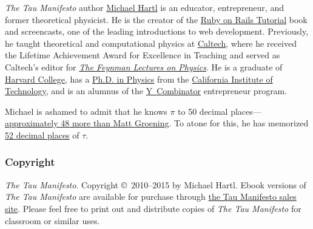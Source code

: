 
\emph{The Tau Manifesto} author \href{http://www.michaelhartl.com/}{Michael Hartl} is an educator, entrepreneur, and former theoretical physicist. He is the creator of the \href{http://www.railstutorial.org/}{Ruby on Rails Tutorial} book and screencasts, one of the leading introductions to web development. Previously, he taught theoretical and computational physics at  \href{http://www.caltech.edu/}{Caltech}, where he received the Lifetime Achievement Award for Excellence in Teaching and served as Caltech's editor for \href{http://www.feynmanlectures.caltech.edu/}{\emph{The Feynman Lectures on Physics}}. He is a graduate of \href{http://college.harvard.edu/}{Harvard College}, has a \href{http://thesis.library.caltech.edu/1940/}{Ph.D. in Physics} from the \href{http://www.caltech.edu/}{California Institute of Technology}, and is an alumnus of the \href{http://ycombinator.com/}{Y~Combinator} entrepreneur program.

Michael is ashamed to admit that he knows $\pi$ to 50 decimal places---\href{\#fig:futurama_video}{approximately 48 more than Matt Groening}. To atone for this, he has memorized \href{http://www.wolframalpha.com/input/?i=N[2+Pi,+53]}{52 decimal places} of $\tau$.

    \subsubsection{Copyright} %
    \label{sec:copyright_and_license}

    \emph{The Tau Manifesto}. Copyright \copyright\ 2010--2015 by Michael Hartl. Ebook versions of \emph{The Tau Manifesto} are available for purchase through \href{http://sales.tauday.com/}{the Tau Manifesto sales site}. Please feel free to print out and distribute copies of \emph{The Tau Manifesto} for classroom or similar uses.

